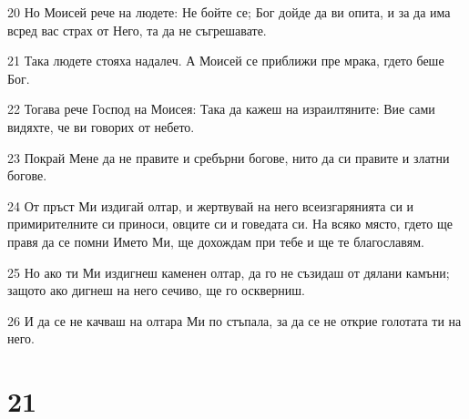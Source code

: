 \par 20 Но Моисей рече на людете: Не бойте се; Бог дойде да ви опита, и за да има всред вас страх от Него, та да не съгрешавате.
\par 21 Така людете стояха надалеч. А Моисей се приближи пре мрака, гдето беше Бог.
\par 22 Тогава рече Господ на Моисея: Така да кажеш на израилтяните: Вие сами видяхте, че ви говорих от небето.
\par 23 Покрай Мене да не правите и сребърни богове, нито да си правите и златни богове.
\par 24 От пръст Ми издигай олтар, и жертвувай на него всеизгарянията си и примирителните си приноси, овците си и говедата си. На всяко място, гдето ще правя да се помни Името Ми, ще дохождам при тебе и ще те благославям.
\par 25 Но ако ти Ми издигнеш каменен олтар, да го не съзидаш от дялани камъни; защото ако дигнеш на него сечиво, ще го оскверниш.
\par 26 И да се не качваш на олтара Ми по стъпала, за да се не открие голотата ти на него.

\chapter{21}

